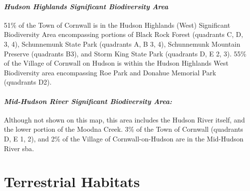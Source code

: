 \paragraph{\textit{Hudson Highlands Significant Biodiversity Area}}51\% of the 
Town of Cornwall is in the Hudson Highlands (West) Significant Biodiversity 
Area encompassing portions of Black Rock Forest (quadrants C, D, \/ 3, 4), 
Schunnemunk State Park (quadrants A, B \/ 3, 4), Schunnemunk Mountain Preserve 
(quadrants B3), and Storm King State Park (quadrants D, E \/ 2, 3). 55\% of the 
Village of Cornwall on Hudson is within the Hudson Highlands West Biodiversity 
area encompassing Roe Park and Donahue Memorial Park (quadrants D2). 

\paragraph{\textit{Mid-Hudson River Significant Biodiversity Area:}} Although not 
shown on this map, this area includes the Hudson River itself, and the lower 
portion of the Moodna Creek. 3\% of the Town of Cornwall (quadrants D, E \/ 1, 
2), and 2\% of the Village of Cornwall-on-Hudson are in the Mid-Hudson River 
\gls{sba}.


\label{map:aok}
\section{Terrestrial Habitats}\label{subsec:terrestrialhabitats}
